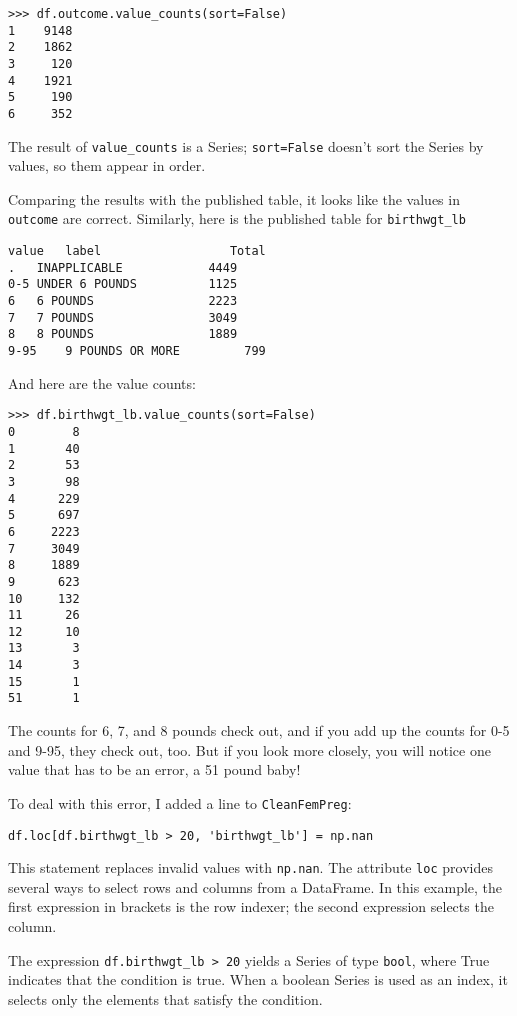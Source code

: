 \documentclass[12pt]{book}
\begin{document}
\begin{verbatim}
>>> df.outcome.value_counts(sort=False)
1    9148
2    1862
3     120
4    1921
5     190
6     352
\end{verbatim}

The result of \verb"value_counts" is a Series;
\verb"sort=False" doesn't sort the Series by values, so them
appear in order.

Comparing the results with the published table, it looks like the
values in {\tt outcome} are correct.  Similarly, here is the published
table for \verb"birthwgt_lb"

\begin{verbatim}
value	label                  Total
.	INAPPLICABLE            4449
0-5	UNDER 6 POUNDS          1125
6	6 POUNDS                2223
7	7 POUNDS                3049
8	8 POUNDS                1889
9-95	9 POUNDS OR MORE         799
\end{verbatim}

And here are the value counts:

\begin{verbatim}
>>> df.birthwgt_lb.value_counts(sort=False)
0        8
1       40
2       53
3       98
4      229
5      697
6     2223
7     3049
8     1889
9      623
10     132
11      26
12      10
13       3
14       3
15       1
51       1
\end{verbatim}

The counts for 6, 7, and 8 pounds check out, and if you add
up the counts for 0-5 and 9-95, they check out, too.  But
if you look more closely, you will notice one value that has to be
an error, a 51 pound baby!

To deal with this error, I added a line to {\tt CleanFemPreg}:

\begin{verbatim}
df.loc[df.birthwgt_lb > 20, 'birthwgt_lb'] = np.nan
\end{verbatim}

This statement replaces invalid values with {\tt np.nan}.
The attribute {\tt loc} provides several ways to select
rows and columns from a DataFrame.  In this example, the
first expression in brackets is the row indexer; the second
expression selects the column.

The expression \verb"df.birthwgt_lb > 20" yields a Series of type
{\tt bool}, where True indicates that the condition is true.  When a
boolean Series is used as an index, it selects only the elements that
satisfy the condition.
  
\end{document}
